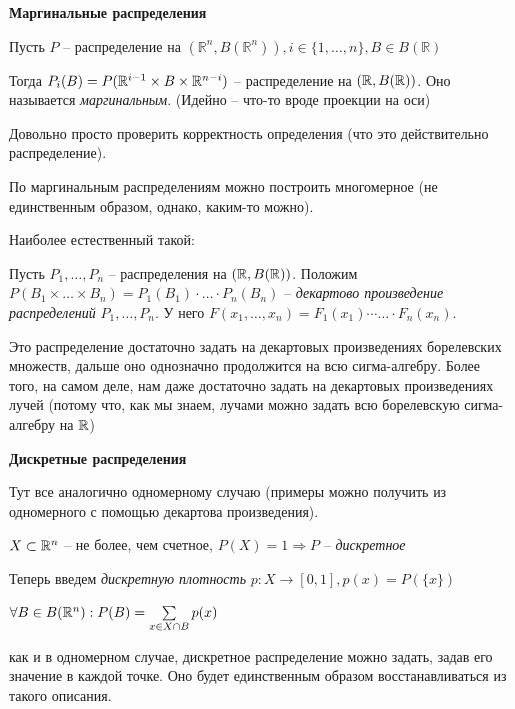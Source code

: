 \textbf{Маргинальные распределения}

\begin{definition}
Пусть $P$ -- распределение на $(\mathbb{R}^n, B(\mathbb{R}^n)), i \in \{1, \ldots, n\}, B \in B(\mathbb{R})$
\end{definition}

Тогда $P_i(B) = P(\mathbb{R}^{i-1} \times B \times \mathbb{R}^{n-i})$ -- распределение на $(\mathbb{R}, B(\mathbb{R}))$. Оно называется \textit{маргинальным}. (Идейно -- что-то вроде проекции на оси)

Довольно просто проверить корректность определения (что это действительно распределение).

По маргинальным распределениям можно построить многомерное (не единственным образом, однако, каким-то можно).

Наиболее естественный такой:
 
Пусть $P_1, \ldots, P_n$ -- распределения на $(\mathbb{R}, B(\mathbb{R}))$. Положим $P(B_1 \times \ldots \times B_n) = P_1(B_1) \cdot \ldots \cdot P_n(B_n)$ -- \textit{декартово произведение распределений} $P_1, \ldots, P_n$. У него $F(x_1, \ldots, x_n) = F_1(x_1) \cdots \ldots \cdot F_n(x_n)$.
 
\begin{lemmanote} 
Это распределение достаточно задать на декартовых произведениях борелевских множеств, дальше оно однозначно продолжится на всю сигма-алгебру. Более того, на самом деле, нам даже достаточно задать на декартовых произведениях лучей (потому что, как мы знаем, лучами можно задать всю борелевскую сигма-алгебру на $\mathbb{R}$)\\
\end{lemmanote}


\textbf{Дискретные распределения}

Тут все аналогично одномерному случаю (примеры можно получить из одномерного с помощью декартова произведения).

$X \subset \mathbb{R}^n$ -- не более, чем счетное, $P(X) = 1 \Rightarrow P$ -- \textit{дискретное}

Теперь введем \textit{дискретную плотность} $p: X \to [0, 1], p(x) = P(\{x\})$

$\forall B \in B(\mathbb{R}^n) : P(B) = \sum\limits_{x \in X \cap B}p(x)$

\begin{lemmanote}
как и в одномерном случае, дискретное распределение можно задать, задав его значение в каждой точке. Оно будет единственным образом восстанавливаться из такого описания.\\
\end{lemmanote}

